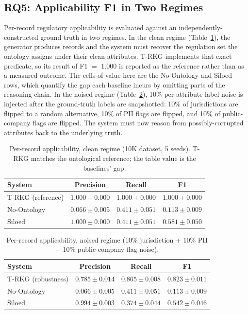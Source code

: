 \documentclass{ieeeaccess}
\begin{document}
\subsection{RQ5: Applicability F1 in Two Regimes}

Per-record regulatory applicability is evaluated against an independently-constructed ground truth in two regimes. In the clean regime (Table~\ref{tab:f1clean}), the generator produces records and the system must recover the regulation set the ontology assigns under their clean attributes. T-RKG implements that exact predicate, so its result of F1 $=$ 1.000 is reported as the reference rather than as a measured outcome. The cells of value here are the No-Ontology and Siloed rows, which quantify the gap each baseline incurs by omitting parts of the reasoning chain. In the noised regime (Table~\ref{tab:f1noise}), 10\% per-attribute label noise is injected after the ground-truth labels are snapshotted: 10\% of jurisdictions are flipped to a random alternative, 10\% of PII flags are flipped, and 10\% of public-company flags are flipped. The system must now reason from possibly-corrupted attributes back to the underlying truth.

\begin{table}[t]
\centering
\caption{Per-record applicability, clean regime (10K dataset, 5 seeds). T-RKG matches the ontological reference; the table value is the baselines' gap.}
\label{tab:f1clean}
\begin{tabular}{lccc}
\hline\hline
System & Precision & Recall & F1 \\
\hline
T-RKG (reference) & $1.000 \pm 0.000$ & $1.000 \pm 0.000$ & $1.000 \pm 0.000$ \\
No-Ontology       & $0.066 \pm 0.005$ & $0.411 \pm 0.051$ & $0.113 \pm 0.009$ \\
Siloed            & $1.000 \pm 0.000$ & $0.411 \pm 0.051$ & $0.581 \pm 0.050$ \\
\hline\hline
\end{tabular}
\end{table}

\begin{table}[t]
\centering
\caption{Per-record applicability, noised regime (10\% jurisdiction + 10\% PII + 10\% public-company-flag noise).}
\label{tab:f1noise}
\begin{tabular}{lccc}
\hline\hline
System & Precision & Recall & F1 \\
\hline
T-RKG (robustness) & $0.785 \pm 0.014$ & $0.865 \pm 0.008$ & $0.823 \pm 0.011$ \\
No-Ontology        & $0.066 \pm 0.005$ & $0.411 \pm 0.051$ & $0.113 \pm 0.009$ \\
Siloed             & $0.994 \pm 0.003$ & $0.374 \pm 0.044$ & $0.542 \pm 0.046$ \\
\hline\hline
\end{tabular}
\end{table}
\end{document}
